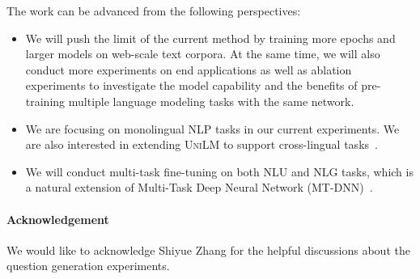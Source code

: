 \documentclass{article}
\newcommand\ours{\textsc{UniLM}}
\begin{document}
The work can be advanced from the following perspectives:
\begin{itemize}[leftmargin=*]
\setlength\itemsep{0.01em}
\item We will push the limit of the current method by training more epochs and larger models on web-scale text corpora. At the same time, we will also conduct more experiments on end applications as well as ablation experiments to investigate the model capability and the benefits of pre-training multiple language modeling tasks with the same network.
\item We are focusing on monolingual NLP tasks in our current experiments. We are also interested in extending \ours{} to support cross-lingual tasks~\cite{xnlg}.
\item We will conduct multi-task fine-tuning on both NLU and NLG tasks, which is a natural extension of Multi-Task Deep Neural Network (MT-DNN)~\cite{mt-dnn}.
\end{itemize}

\paragraph{Acknowledgement}
We would like to acknowledge Shiyue Zhang for the helpful discussions about the question generation experiments.



\end{document}
